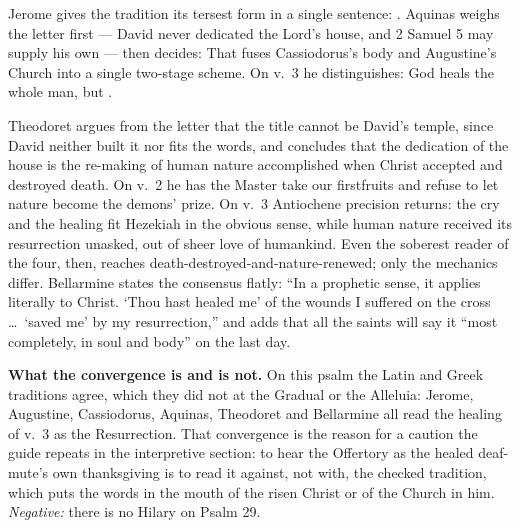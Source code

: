\begin{witnessnote}
Jerome gives the tradition its tersest form in a single sentence:
. Aquinas weighs the letter first --- David never
dedicated the Lord's house, and 2 Samuel 5 may supply his own --- then decides:
 That fuses Cassiodorus's body and
Augustine's Church into a single two-stage scheme. On v.~3 he distinguishes:
God heals the whole man, but .
\end{witnessnote}

\begin{witnessnote}
Theodoret argues from the letter that the title cannot be David's temple, since
David neither built it nor fits the words, and concludes that the dedication of
the house is the re-making of human nature accomplished when Christ accepted
and destroyed death. On v.~2 he has the Master take our firstfruits and refuse
to let nature become the demons' prize. On v.~3 Antiochene precision returns:
the cry and the healing fit Hezekiah in the obvious sense, while human nature
received its resurrection unasked, out of sheer love of humankind. Even the
soberest reader of the four, then, reaches death-destroyed-and-nature-renewed;
only the mechanics differ. Bellarmine states the consensus flatly: ``In a
prophetic sense, it applies literally to Christ. `Thou hast healed me' of the
wounds I suffered on the cross \dots\ `saved me' by my resurrection,'' and adds
that all the saints will say it ``most completely, in soul and body'' on the
last day.
\end{witnessnote}

\textbf{What the convergence is and is not.} On this psalm the Latin and Greek
traditions agree, which they did not at the Gradual or the Alleluia: Jerome,
Augustine, Cassiodorus, Aquinas, Theodoret and Bellarmine all read the healing
of v.~3 as the Resurrection. That convergence is the reason for a caution the
guide repeats in the interpretive section: to hear the Offertory as the healed
deaf-mute's own thanksgiving is to read it against, not with, the checked
tradition, which puts the words in the mouth of the risen Christ or of the
Church in him. \textit{Negative:} there is no Hilary on Psalm 29.


